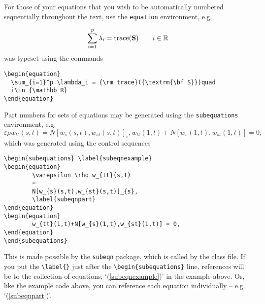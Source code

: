 \documentclass{gCMB2e}
\begin{document}
For those of your equations that you wish to be automatically
numbered sequentially throughout the text, use the {\tt{equation}}
environment, e.g.

\begin{equation}
  \sum_{i=1}^p \lambda_i = {\rm trace}({\textrm{\bf S}})\qquad
  i\in {\mathbb R}
\end{equation}
%
was typeset using the commands

\begin{verbatim}
\begin{equation}
  \sum_{i=1}^p \lambda_i = {\rm trace}({\textrm{\bf S}})quad
  i\in {\mathbb R}
\end{equation}
\end{verbatim}

Part numbers for sets of equations may be generated using the
{\tt{subequations}} environment, e.g.
\begin{subequations} \label{subeqnexample}
\begin{equation}
        \varepsilon \rho w_{tt}(s,t)
        =
        N[w_{s}(s,t),w_{st}(s,t)]_{s},
        \label{subeqnpart}
\end{equation}
\begin{equation}
        w_{tt}(1,t)+N[w_{s}(1,t),w_{st}(1,t)] = 0,
\end{equation}
\end{subequations}
which was generated using the control sequences

\begin{verbatim}
\begin{subequations} \label{subeqnexample}
\begin{equation}
        \varepsilon \rho w_{tt}(s,t)
        =
        N[w_{s}(s,t),w_{st}(s,t)]_{s},
        \label{subeqnpart}
\end{equation}
\begin{equation}
        w_{tt}(1,t)+N[w_{s}(1,t),w_{st}(1,t)] = 0,
\end{equation}
\end{subequations}
\end{verbatim}
This is made possible by the {\tt{subeqn}} package, which is called
by the class file. If you put the \verb"\label{}" just after the
\verb"\begin{subequations}" line, references will be to the
collection of equations, `(\ref{subeqnexample})' in the example
above. Or, like the example code above, you can reference each
equation individually -- e.g. `(\ref{subeqnpart})'.
\end{document}
